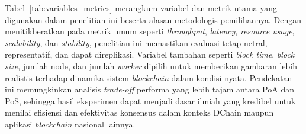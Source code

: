 Tabel~\ref{tab:variables_metrics} merangkum variabel dan metrik utama yang digunakan dalam penelitian ini beserta alasan metodologis pemilihannya. Dengan menitikberatkan pada metrik umum seperti \textit{throughput}, \textit{latency}, \textit{resource usage}, \textit{scalability}, dan \textit{stability}, penelitian ini memastikan evaluasi tetap netral, representatif, dan dapat direplikasi. Variabel tambahan seperti \textit{block time}, \textit{block size}, jumlah node, dan jumlah \textit{worker} dipilih untuk memberikan gambaran lebih realistis terhadap dinamika sistem \textit{blockchain} dalam kondisi nyata. Pendekatan ini memungkinkan analisis \textit{trade-off} performa yang lebih tajam antara PoA dan PoS, sehingga hasil eksperimen dapat menjadi dasar ilmiah yang kredibel untuk menilai efisiensi dan efektivitas konsensus dalam konteks DChain maupun aplikasi \textit{blockchain} nasional lainnya.